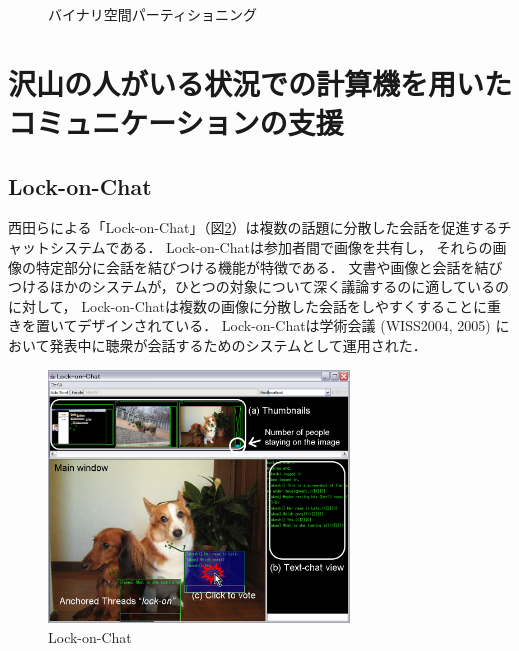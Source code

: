 \begin{figure}[H]
\centering
{}
\caption{バイナリ空間パーティショニング}
\label{hertzog}
\end{figure}


\section{沢山の人がいる状況での計算機を用いたコミュニケーションの支援}

\subsection{Lock-on-Chat}

西田らによる「Lock-on-Chat\cite{nishida2006}」（図\ref{lockonchat}）は複数の話題に分散した会話を促進するチャットシステムである．
Lock-on-Chatは参加者間で画像を共有し，
それらの画像の特定部分に会話を結びつける機能が特徴である．
文書や画像と会話を結びつけるほかのシステムが，ひとつの対象について深く議論するのに適しているのに対して，
Lock-on-Chatは複数の画像に分散した会話をしやすくすることに重きを置いてデザインされている．
Lock-on-Chatは学術会議 (WISS2004, 2005) において発表中に聴衆が会話するためのシステムとして運用された．

\begin{figure}[H]
\centering
\includegraphics[width=8cm]{images/lockonchat.png}
\caption{Lock-on-Chat}
\label{lockonchat}
\end{figure}


